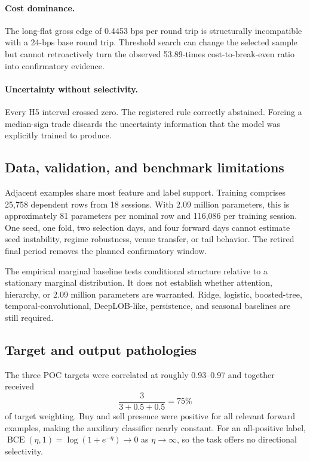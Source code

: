 \documentclass[10pt,letterpaper]{article}
\numberwithin{equation}{section}
\theoremstyle{definition}
\theoremstyle{remark}
\begin{document}
\paragraph{Cost dominance.}
The long-flat gross edge of 0.4453 bps per round trip is structurally
incompatible with a 24-bps base round trip. Threshold search can change the
selected sample but cannot retroactively turn the observed 53.89-times
cost-to-break-even ratio into confirmatory evidence.

\paragraph{Uncertainty without selectivity.}
Every H5 interval crossed zero. The registered rule correctly abstained.
Forcing a median-sign trade discards the uncertainty information that the model
was explicitly trained to produce.

\subsection{Data, validation, and benchmark limitations}

Adjacent examples share most feature and label support. Training comprises
25,758 dependent rows from 18 sessions. With 2.09 million parameters, this is
approximately 81 parameters per nominal row and 116,086 per training session.
One seed, one fold, two selection days, and four forward days cannot estimate
seed instability, regime robustness, venue transfer, or tail behavior. The
retired final period removes the planned confirmatory window.

The empirical marginal baseline tests conditional structure relative to a
stationary marginal distribution. It does not establish whether attention,
hierarchy, or 2.09 million parameters are warranted. Ridge, logistic,
boosted-tree, temporal-convolutional, DeepLOB-like, persistence, and seasonal
baselines are still required.

\subsection{Target and output pathologies}

The three POC targets were correlated at roughly 0.93--0.97 and together
received
\begin{equation}
\frac{3}{3+0.5+0.5}=75\%
\label{eq:poc-weight}
\end{equation}
of target weighting. Buy and sell presence were positive for all relevant
forward examples, making the auxiliary classifier nearly constant. For an
all-positive label, \(\operatorname{BCE}(\eta,1)=\log(1+e^{-\eta})\to0\) as
\(\eta\to\infty\), so the task offers no directional selectivity.
\end{document}
